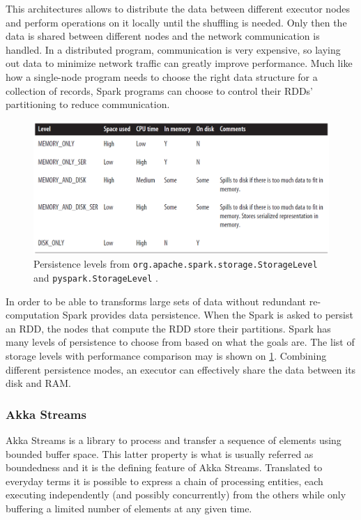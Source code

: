 This architectures allows to distribute the data between different executor nodes and perform operations on it locally until the shuffling is needed. Only then the data is shared between different nodes and the network communication is handled. In a distributed program, communication is very expensive, so laying out data to minimize network traffic can greatly improve performance. Much like how a single-node program needs to choose the right data structure for a collection of records, Spark programs can choose to control their RDDs’ partitioning to reduce communication.

\begin{figure}
\centering \includegraphics[width=.9\textwidth]{img/spark_persistence_levels}
\caption{ Persistence levels from \texttt{org.apache.spark.storage.StorageLevel} and
\texttt{pyspark.StorageLevel} \cite{learning_spark}.}\label{img:spark_persistence_levels}
\end{figure}

In order to be able to transforms large sets of data without redundant re-computation Spark provides data persistence. When the Spark is asked to persist an RDD, the nodes that compute the RDD store their partitions. Spark has many levels of persistence to choose from based on what the goals are. The list of storage levels with performance comparison may is shown on \ref{img:spark_persistence_levels}. Combining different persistence modes, an executor can effectively share the data between its disk and RAM.

\subsubsection{Akka Streams}

Akka Streams is a library to process and transfer a sequence of elements using bounded buffer space. This latter property is what is usually referred as boundedness and it is the defining feature of Akka Streams. Translated to everyday terms it is possible to express a chain of processing entities, each executing independently (and possibly concurrently) from the others while only buffering a limited number of elements at any given time. 

